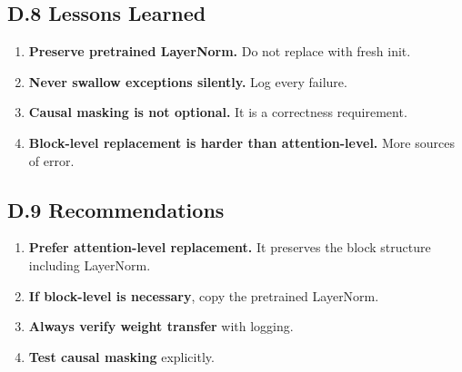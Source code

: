 \subsection{D.8 Lessons Learned}

\begin{enumerate}
\item \textbf{Preserve pretrained LayerNorm.} Do not replace with fresh init.
\item \textbf{Never swallow exceptions silently.} Log every failure.
\item \textbf{Causal masking is not optional.} It is a correctness requirement.
\item \textbf{Block-level replacement is harder than attention-level.} More sources
  of error.

\end{enumerate}
\subsection{D.9 Recommendations}

\begin{enumerate}
\item \textbf{Prefer attention-level replacement.} It preserves the block structure
  including LayerNorm.
\item \textbf{If block-level is necessary}, copy the pretrained LayerNorm.
\item \textbf{Always verify weight transfer} with logging.
\item \textbf{Test causal masking} explicitly.

\end{enumerate}
